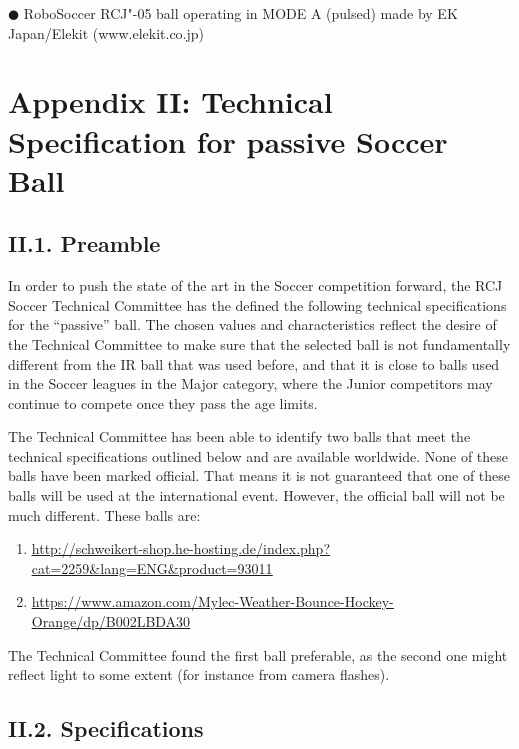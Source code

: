 \documentclass{article}
\begin{document}
$\CIRCLE $ \textcolor{color-5}{RoboSoccer RCJ"-05 ball operating in MODE A (pulsed) made by EK Japan/Elekit (www.elekit.co.jp)}

\section{Appendix II: Technical Specification for passive Soccer Ball\label{ref-063}}

\subsection{II.1. Preamble}

In order to push the state of the art in the Soccer competition forward, the RCJ Soccer Technical Committee has the defined the following technical specifications for the ``passive'' ball. The chosen values and characteristics reflect the desire of the Technical Committee to make sure that the selected ball is not fundamentally different from the IR ball that was used before, and that it is close to balls used in the Soccer leagues in the Major category, where the Junior competitors may continue to compete once they pass the age limits.

The Technical Committee has been able to identify two balls that meet the technical specifications outlined below and are available worldwide. None of these balls have been marked official. That means it is not guaranteed that one of these balls will be used at the international event. However, the official ball will not be much different. These balls are:

\begin{enumerate}[1]

\item \underline{\href{http://schweikert-shop.he-hosting.de/index.php?cat=2259&lang=ENG&product=93011}{http://schweikert-shop.he-hosting.de/index.php?cat=2259\&lang=ENG\&product=93011}}

\item \underline{\href{https://www.amazon.com/Mylec-Weather-Bounce-Hockey-Orange/dp/B002LBDA30}{https://www.amazon.com/Mylec-Weather-Bounce-Hockey-Orange/dp/B002LBDA30}}

\end{enumerate}

The Technical Committee found the first ball preferable, as the second one might reflect light to some extent (for instance from camera flashes).

\subsection{II.2. Specifications}
\end{document}
